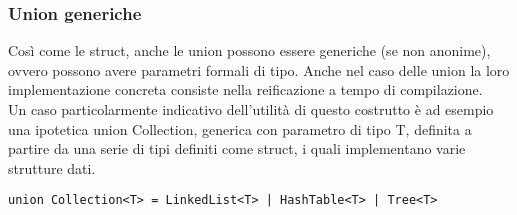 \subsubsection{Union generiche}
Così come le struct, anche le union possono essere generiche (se non anonime), ovvero possono avere parametri formali di tipo. Anche 
nel caso delle union la loro implementazione concreta consiste nella reificazione a tempo di compilazione. \\

Un caso particolarmente indicativo dell’utilità di questo costrutto è ad esempio una ipotetica union Collection, generica 
con parametro di tipo T, definita a partire da una serie di tipi definiti come struct, i quali implementano varie strutture dati. \\


\begin{lstlisting}[frame=single]
union Collection<T> = LinkedList<T> | HashTable<T> | Tree<T>
\end{lstlisting}
